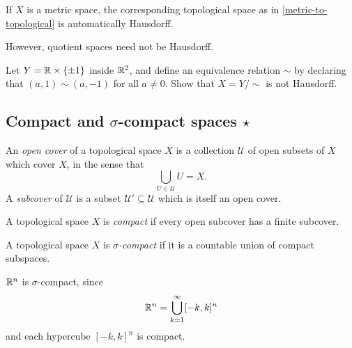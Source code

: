 \begin{example}
	If $X$ is a metric space, the corresponding topological space as in \cref{metric-to-topological} is automatically Hausdorff. 
\end{example}

However, quotient spaces need not be Hausdorff. 

\begin{exercise}
	Let $Y = \mathbb{R} \times \{\pm 1 \}$ inside $\mathbb{R}^2$, and define an equivalence relation $\sim$ by declaring that $(a, 1) \sim (a,-1)$ for all $a \neq 0$. Show that $X = Y/\sim$ is not Hausdorff. 
\end{exercise}

\subsection{Compact and \texorpdfstring{$\sigma$}{sigma}-compact spaces \texorpdfstring{$\star$}{*}} 

\begin{definition}   
	An \emph{open cover} of a topological space $X$ is a collection $\mathscr{U}$ of open subsets of $X$ which cover $X$, in the sense that \[ \bigcup_{U \in \mathscr{U}} U = X. \]
	A \emph{subcover} of $\mathscr{U}$ is a subset $\mathscr{U}' \subseteq  \mathscr{U}$ which is itself an open cover. 
\end{definition}

\begin{definition}[Compact]  \label{compact-topological-space}
	A topological space $X$ is \emph{compact} if every open subcover has a finite subcover. 
\end{definition}

\begin{definition} 
	A topological space $X$ is \emph{$\sigma$-compact} if it is a countable union of compact subspaces. 
\end{definition}

\begin{example}
	$\mathbb{R}^n$ is $\sigma$-compact, since
	\[ \mathbb{R}^n = \bigcup_{k = 1}^\infty [-k,k]^n \]
	and each hypercube $[-k,k]^n$ is compact. 
\end{example}

